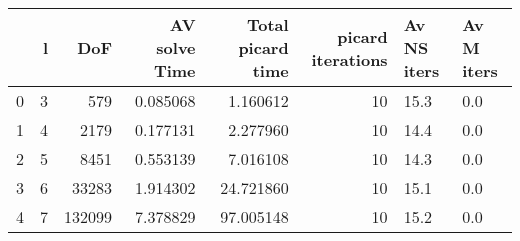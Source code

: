 \begin{tabular}{lrrrrrll}
\toprule
{} &  l &     DoF &  AV solve Time &  Total picard time &  picard iterations & Av NS iters & Av M iters \\
\midrule
0 &  3 &     579 &       0.085068 &           1.160612 &                 10 &        15.3 &        0.0 \\
1 &  4 &    2179 &       0.177131 &           2.277960 &                 10 &        14.4 &        0.0 \\
2 &  5 &    8451 &       0.553139 &           7.016108 &                 10 &        14.3 &        0.0 \\
3 &  6 &   33283 &       1.914302 &          24.721860 &                 10 &        15.1 &        0.0 \\
4 &  7 &  132099 &       7.378829 &          97.005148 &                 10 &        15.2 &        0.0 \\
\bottomrule
\end{tabular}
